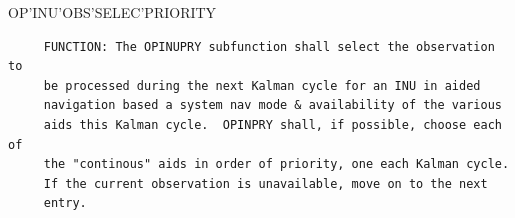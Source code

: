 \begin{frame}
OP'INU'OBS'SELEC'PRIORITY
\begin{verbatim}
     FUNCTION: The OPINUPRY subfunction shall select the observation to
     be processed during the next Kalman cycle for an INU in aided
     navigation based a system nav mode & availability of the various
     aids this Kalman cycle.  OPINPRY shall, if possible, choose each of
     the "continous" aids in order of priority, one each Kalman cycle.
     If the current observation is unavailable, move on to the next
     entry.

\end{verbatim}
\end{frame}
